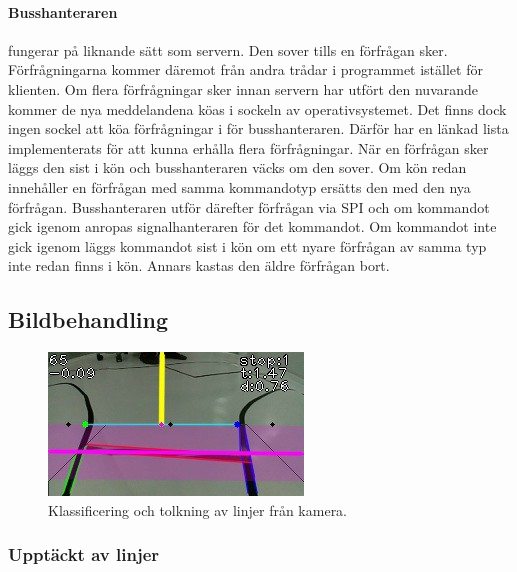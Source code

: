 \documentclass[tekniskrapport/tech.tex]{subfiles}
\begin{document}
\paragraph{Busshanteraren} fungerar på liknande sätt som servern. Den sover
tills en förfrågan sker. Förfrågningarna kommer däremot från andra trådar i
programmet istället för klienten. Om flera förfrågningar sker innan servern har
utfört den nuvarande kommer de nya meddelandena köas i sockeln av
operativsystemet. Det finns dock ingen sockel att köa förfrågningar i för
busshanteraren. Därför har en länkad lista implementerats för att kunna erhålla
flera förfrågningar. När en förfrågan sker läggs den sist i kön och
busshanteraren väcks om den sover. Om kön redan innehåller en förfrågan med
samma kommandotyp ersätts den med den nya förfrågan. Busshanteraren utför
därefter förfrågan via SPI och om kommandot gick igenom anropas
signalhanteraren för det kommandot. Om kommandot inte gick igenom läggs
kommandot sist i kön om ett nyare förfrågan av samma typ inte redan finns i
kön. Annars kastas den äldre förfrågan bort.

\subsection{Bildbehandling}
\begin{figure}
    \begin{center}
        \includegraphics[width=\linewidth]{tekniskrapport/figures/opencv.jpg}
    \end{center}
    \caption{Klassificering och tolkning av linjer från kamera.}
\end{figure}

\subsubsection{Upptäckt av linjer}
\end{document}
